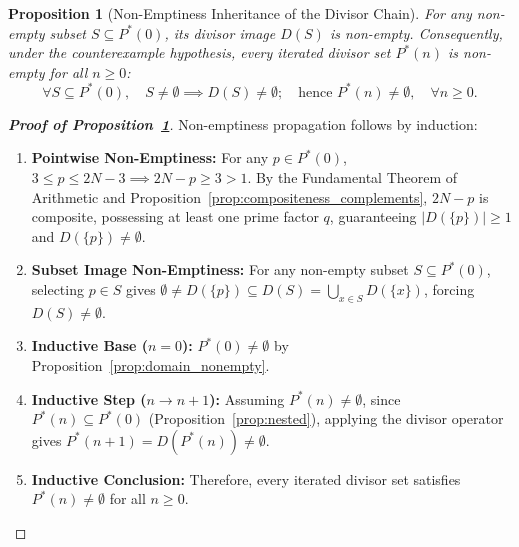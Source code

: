 \documentclass[11pt,a4paper]{article}
\newtheorem{proposition}[theorem]{Proposition}
\theoremstyle{definition}
\begin{document}
\begin{proposition}[Non-Emptiness Inheritance of the Divisor Chain]
\label{prop:nonempty_inheritance}
For any non-empty subset $S \subseteq P^*(0)$, its divisor image $D(S)$ is non-empty. Consequently, under the counterexample hypothesis, every iterated divisor set $P^*(n)$ is non-empty for all $n \ge 0$:
\[
\forall S \subseteq P^*(0), \quad S \neq \emptyset \implies D(S) \neq \emptyset; \quad \text{hence } P^*(n) \neq \emptyset, \quad \forall n \ge 0.
\]
\end{proposition}
\begin{proof}[\textbf{Proof of Proposition~\ref{prop:nonempty_inheritance}}]
Non-emptiness propagation follows by induction:
\begin{enumerate}
    \item \textbf{Pointwise Non-Emptiness:} For any $p \in P^*(0)$, $3 \le p \le 2N - 3 \implies 2N - p \ge 3 > 1$. By the Fundamental Theorem of Arithmetic and Proposition~\ref{prop:compositeness_complements}, $2N - p$ is composite, possessing at least one prime factor $q$, guaranteeing $|D(\{p\})| \ge 1$ and $D(\{p\}) \neq \emptyset$.
    \item \textbf{Subset Image Non-Emptiness:} For any non-empty subset $S \subseteq P^*(0)$, selecting $p \in S$ gives $\emptyset \neq D(\{p\}) \subseteq D(S) = \bigcup_{x \in S} D(\{x\})$, forcing $D(S) \neq \emptyset$.
    \item \textbf{Inductive Base ($n=0$):} $P^*(0) \neq \emptyset$ by Proposition~\ref{prop:domain_nonempty}.
    \item \textbf{Inductive Step ($n \to n+1$):} Assuming $P^*(n) \neq \emptyset$, since $P^*(n) \subseteq P^*(0)$ (Proposition~\ref{prop:nested}), applying the divisor operator gives $P^*(n+1) = D(P^*(n)) \neq \emptyset$.
    \item \textbf{Inductive Conclusion:} Therefore, every iterated divisor set satisfies $P^*(n) \neq \emptyset$ for all $n \ge 0$.
\end{enumerate}
\end{proof}
\end{document}
